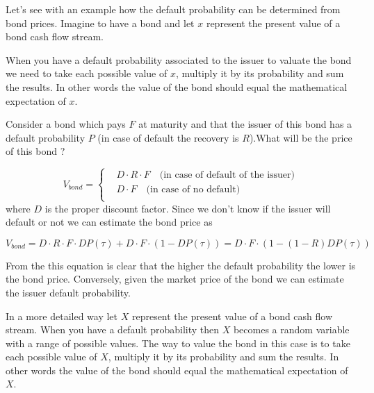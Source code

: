 {Let's see with an example how the default probability can be determined
from bond prices. Imagine to have a bond and let \(x\) represent the
present value of a bond cash flow stream.

When you have a default probability associated to the issuer to valuate
the bond we need to take each possible value of \(x\), multiply it by
its probability and sum the results. In other words the value of the
bond should equal the mathematical expectation of \(x\).

Consider a bond which pays \(F\) at maturity and that the issuer of this
bond has a default probability \(P\) (in case of default the recovery is
\(R\)).What will be the price of this bond ?

\begin{equation}
V_{bond} =
\begin{cases}
& D \cdot R \cdot F\quad\textrm{(in case of default of the issuer)}\\
&D \cdot F\quad\textrm{(in case of no default)}\\
\end{cases}\end{equation} 
where \(D\) is the proper discount factor. Since we don't
know if the issuer will default or not we can estimate the bond price as

\begin{equation}
V_{bond} = D \cdot R \cdot F \cdot DP ( \tau ) + D \cdot F \cdot ( 1 − DP ( \tau)) = D\cdot F \cdot ( 1 − ( 1 − R ) DP ( \tau ))\end{equation}

From the this equation is clear that the higher the default probability
the lower is the bond price. Conversely, given the market price of the
bond we can estimate the issuer default probability.

%

In a more detailed way let $X$ represent the present value of a bond cash flow stream. When you
have a default probability then $X$ becomes a random variable with a range
of possible values. The way
to value the bond in this case is to take each possible value of $X$, multiply it
by its probability and sum the results. In other words the value of the bond
should equal the mathematical expectation of $X$.

}
